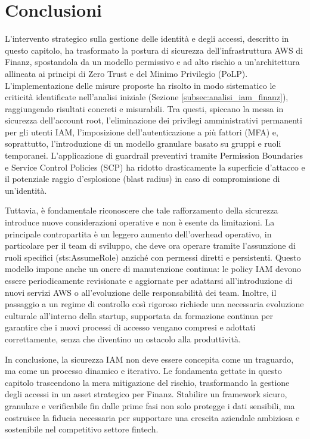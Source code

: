 \section{Conclusioni}
L'intervento strategico sulla gestione delle identità e degli accessi, descritto in questo capitolo, ha trasformato la postura di sicurezza dell'infrastruttura AWS di Finanz, spostandola da un modello permissivo e ad alto rischio a un'architettura allineata ai principi di Zero Trust e del Minimo Privilegio (PoLP). L'implementazione delle misure proposte ha risolto in modo sistematico le criticità identificate nell'analisi iniziale (Sezione \ref{subsec:analisi_iam_finanz}), raggiungendo risultati concreti e misurabili. Tra questi, spiccano la messa in sicurezza dell'account root, l'eliminazione dei privilegi amministrativi permanenti per gli utenti IAM, l'imposizione dell'autenticazione a più fattori (MFA) e, soprattutto, l'introduzione di un modello granulare basato su gruppi e ruoli temporanei. L'applicazione di guardrail preventivi tramite Permission Boundaries e Service Control Policies (SCP) ha ridotto drasticamente la superficie d'attacco e il potenziale raggio d'esplosione (blast radius) in caso di compromissione di un'identità.

Tuttavia, è fondamentale riconoscere che tale rafforzamento della sicurezza introduce nuove considerazioni operative e non è esente da limitazioni. La principale contropartita è un leggero aumento dell'overhead operativo, in particolare per il team di sviluppo, che deve ora operare tramite l'assunzione di ruoli specifici (sts:AssumeRole) anziché con permessi diretti e persistenti. Questo modello impone anche un onere di manutenzione continua: le policy IAM devono essere periodicamente revisionate e aggiornate per adattarsi all'introduzione di nuovi servizi AWS o all'evoluzione delle responsabilità dei team. Inoltre, il passaggio a un regime di controllo così rigoroso richiede una necessaria evoluzione culturale all'interno della startup, supportata da formazione continua per garantire che i nuovi processi di accesso vengano compresi e adottati correttamente, senza che diventino un ostacolo alla produttività.

In conclusione, la sicurezza IAM non deve essere concepita come un traguardo, ma come un processo dinamico e iterativo. Le fondamenta gettate in questo capitolo trascendono la mera mitigazione del rischio, trasformando la gestione degli accessi in un asset strategico per Finanz. Stabilire un framework sicuro, granulare e verificabile fin dalle prime fasi non solo protegge i dati sensibili, ma costruisce la fiducia necessaria per supportare una crescita aziendale ambiziosa e sostenibile nel competitivo settore fintech.